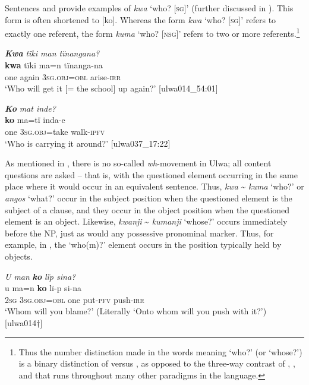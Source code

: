 Sentences  and  provide examples of \textit{kwa} ‘who? [\textsc{sg}]’ (further discussed in ). This form is often shortened to [ko]. Whereas the form \textit{kwa} ‘who? [\textsc{sg}]’ refers to exactly one referent, the form \textit{kuma} ‘who? [\textsc{nsg]}’ refers to two or more referents.\footnote{Thus the number distinction made in the words meaning ‘who?’ (or ‘whose?’) is a binary distinction of  versus , as opposed to the three-way contrast of , , and  that runs throughout many other paradigms in the language.}

\ea%
    \label{ex:syntax:12}
          \textbf{\textit{Kwa}} \textit{tïki man tïnangana?}\\
\gll \textbf{kwa}  tïki    ma=n      tïnanga-na\\
    one    again  3\textsc{sg.obj=obl}  arise-\textsc{irr}\\
\glt `Who will get it [= the school] up again?’ [ulwa014\_54:01]
\z

\ea%
    \label{ex:syntax:13}
          \textbf{\textit{Ko}} \textit{mat inde?}\\
\gll    \textbf{ko}    ma=tï      inda-e\\
    one    3\textsc{sg.obj}=take  walk-\textsc{ipfv}\\
\glt `Who is carrying it around?’ [ulwa037\_17:22]
\z


As mentioned in , there is no so-called \textit{wh}-movement in Ulwa; all content questions are asked  -- that is, with the questioned element occurring in the same place where it would occur in an equivalent  sentence. Thus, \textit{kwa} {\textasciitilde} \textit{kuma} ‘who?’ or \textit{angos} ‘what?’ occur in the subject position when the questioned element is the subject of a clause, and they occur in the object position when the questioned element is an object. Likewise, \textit{kwanji} {\textasciitilde} \textit{kumanji} ‘whose?’ occurs immediately before the  NP, just as would any  possessive pronominal marker. Thus, for example, in , the ‘who(m)?’ element occurs in the position typically held by objects.

\ea%
    \label{ex:syntax:14}
          \textit{U man} \textbf{\textit{ko}} \textit{lïp sina?}\\
\gll    u    ma=n      \textbf{ko}  lï-p      si-na\\
    2\textsc{sg}  3\textsc{sg.obj=obl}  one  put-\textsc{pfv}  push-\textsc{irr}\\
\glt `Whom will you blame?’ (Literally ‘Onto whom will you push with it?’) [ulwa014†]
\z

